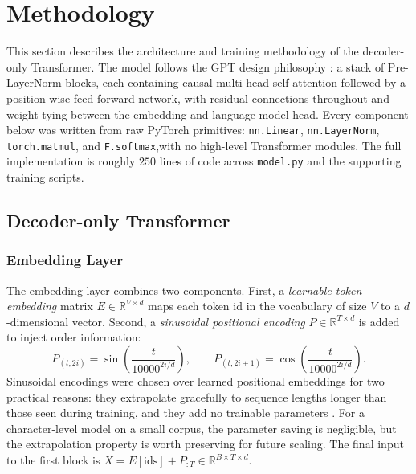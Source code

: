 \newpage
\section{Methodology}
\label{sec:method}

This section describes the architecture and training methodology of the
decoder-only Transformer. The model follows the GPT design philosophy
\parencite{radford2019language}: a stack of Pre-LayerNorm blocks, each
containing causal multi-head self-attention followed by a position-wise
feed-forward network, with residual connections throughout and weight
tying between the embedding and language-model head. Every component
below was written from raw PyTorch primitives: \texttt{nn.Linear},
\texttt{nn.LayerNorm}, \texttt{torch.matmul}, and \texttt{F.softmax},with
no high-level Transformer modules. The full implementation is roughly
$250$ lines of code across \texttt{model.py} and the supporting training
scripts.

\subsection{Decoder-only Transformer}
\label{subsec:transformer}

\subsubsection{Embedding Layer}
The embedding layer combines two components. First, a \emph{learnable
token embedding} matrix $E \in \mathbb{R}^{V \times d}$ maps each token id
in the vocabulary of size $V$ to a $d$-dimensional vector. Second, a
\emph{sinusoidal positional encoding} $P \in \mathbb{R}^{T \times d}$ is
added to inject order information:
\begin{equation}
P_{(t, 2i)}   = \sin\!\left(\frac{t}{10000^{2i/d}}\right), \qquad
P_{(t, 2i+1)} = \cos\!\left(\frac{t}{10000^{2i/d}}\right).
\label{eq:pe}
\end{equation}
Sinusoidal encodings were chosen over learned positional embeddings for
two practical reasons: they extrapolate gracefully to sequence lengths
longer than those seen during training, and they add no trainable
parameters \parencite{vaswani2017attention}. For a character-level model
on a small corpus, the parameter saving is negligible, but the
extrapolation property is worth preserving for future scaling. The final
input to the first block is $X = E[\text{ids}] + P_{:T} \in
\mathbb{R}^{B \times T \times d}$.

